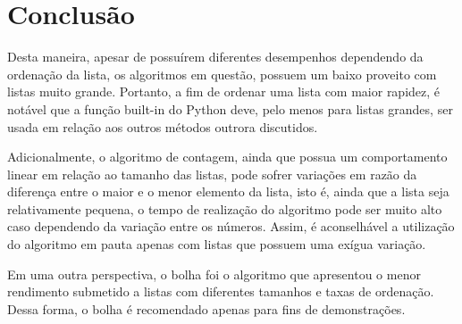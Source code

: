 \section{Conclusão}
Desta maneira, apesar de possuírem diferentes desempenhos dependendo da ordenação da lista, os algoritmos em questão, possuem um baixo proveito com listas muito grande. Portanto, a fim de ordenar uma lista com maior rapidez, é notável que a função built-in do Python deve, pelo menos para listas grandes, ser usada em relação aos outros métodos outrora discutidos.

Adicionalmente, o algoritmo de contagem, ainda que possua um comportamento linear em relação ao tamanho das listas, pode sofrer variações em razão da diferença entre o maior e o menor elemento da lista, isto é, ainda que a lista seja relativamente pequena, o tempo de realização do algoritmo pode ser muito alto caso dependendo da variação entre os números. Assim, é aconselhável a utilização do algoritmo em pauta apenas com listas que possuem uma exígua variação.

Em uma outra perspectiva, o bolha foi o algoritmo que apresentou o menor rendimento submetido a listas com diferentes tamanhos e taxas de ordenação. Dessa forma, o bolha é recomendado apenas para fins de demonstrações.